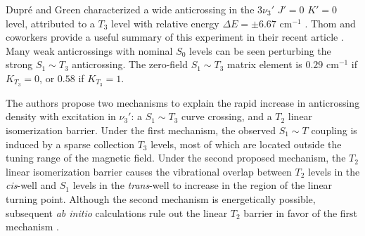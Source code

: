 \documentclass[12pt]{mitthesis}
\begin{document}
Dupr\'{e} and Green characterized a wide anticrossing in the $3\nu_3'$
$J'=0$ $K'=0$ level, attributed to a $T_3$ level with relative energy
$\Delta E = \pm 6.67$ cm$^{-1}$ \cite{dupre93}.  Thom and coworkers
provide a useful summary of this experiment in their recent article
\cite{thom07}.  Many weak anticrossings with nominal $S_0$ levels can
be seen perturbing the strong $S_1 \sim T_3$ anticrossing.  The
zero-field $S_1 \sim T_3$ matrix element is $0.29$ cm$^{-1}$ if
$K_{T_3}=0$, or $0.58$ if $K_{T_3}=1$.

The authors propose two mechanisms to explain the rapid increase in
anticrossing density with excitation in $\nu_3'$: a $S_1 \sim T_3$
curve crossing, and a $T_2$ linear isomerization barrier.  Under the
first mechanism, the observed $S_1 \sim T$ coupling is induced by a
sparse collection $T_3$ levels, most of which are located outside the
tuning range of the magnetic field.  Under the second proposed
mechanism, the $T_2$ linear isomerization barrier causes the
vibrational overlap between $T_2$ levels in the \emph{cis}-well and
$S_1$ levels in the \emph{trans}-well to increase in the region of the
linear turning point.  Although the second mechanism is energetically
possible, subsequent \emph{ab initio} calculations rule out the linear
$T_2$ barrier in favor of the first mechanism \cite{vacek96,
  sherrill96, cui96, cui97, ventura03}.

\end{document}
